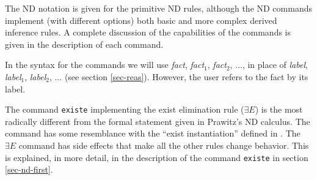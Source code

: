 The ND notation is given for the primitive ND rules, although the ND commands
implement (with different options) both basic and more complex derived inference
rules.
A complete discussion of the capabilities of the commands is given in the
description of each command.

In the syntax for the commands we will use {\em fact}, {\em fact}$_1$,
{\em fact}$_2$, $\ldots$, in place of {\em label}, {\em label}$_1$,
{\em label}$_2$, $\ldots$ (see section \ref{sec-reas}).
However, the user refers to the fact by its label.

The {\GF} command \verb+existe+ implementing the exist elimination rule 
($\exists E$) is the most radically different from the formal statement given
in Prawitz's ND calculus.
The command has some resemblance with the ``exist instantiation'' defined in
\cite{quine3}.
The {\GF} $\exists E$ command has side effects that make all the other
rules change behavior.
This is explained, in more detail, in the description of the command
\verb+existe+ in section \ref{sec-nd-first}.


